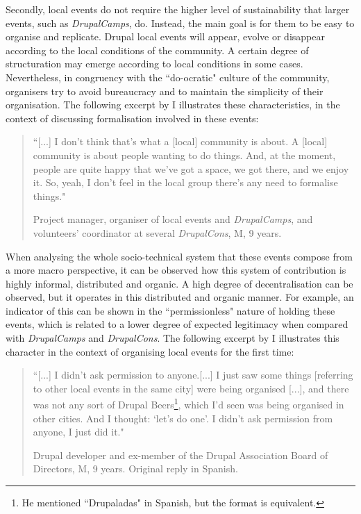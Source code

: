 Secondly, local events do not require the higher level of sustainability that larger events, such as \textit{DrupalCamps}, do. Instead, the main goal is for them to be easy to organise and replicate. Drupal local events will appear, evolve or disappear according to the local conditions of the community.  A certain degree of structuration may emerge according to local conditions in some cases. Nevertheless, in congruency with the ``do-ocratic" culture of the community, organisers try to avoid bureaucracy and to maintain the simplicity of their organisation. The following excerpt by I illustrates these characteristics, in the context of discussing formalisation involved in these events:

\begin{quotation}
``[...] I don't think that's what a [local] community is about. A [local] community is about people wanting to do things. And, at the moment, people are quite happy that we've got a space, we got there, and we enjoy it. So, yeah, I don't feel in the local group there's any need to formalise things."

\begin{flushright}\footnotesize{Project manager, organiser of local events and \textit{DrupalCamps}, and volunteers' coordinator at several \textit{DrupalCons}, M, 9 years.}\end{flushright}
\end{quotation}

When analysing the whole socio-technical system that these events compose from a more macro perspective, it can be observed how this system of contribution is highly informal, distributed and organic. A high degree of decentralisation can be observed, but it operates in this distributed and organic manner. For example, an indicator of this can be shown in the ``permissionless" nature of holding these events, which is related to a lower degree of expected legitimacy when compared with \textit{DrupalCamps} and \textit{DrupalCons}. The following excerpt by I illustrates this character in the context of organising local events for the first time:

\begin{quotation}
``[...] I didn't ask permission to anyone.[...] I just saw some things [referring to other local events in the same city] were being organised [...], and there was not any sort of Drupal Beers\footnote{He mentioned ``Drupaladas" in Spanish, but the format is equivalent.}, which I'd seen was being organised in other cities. And I thought: `let's do one'. I didn't ask permission from anyone, I just did it."

\begin{flushright}\footnotesize{Drupal developer and ex-member of the Drupal Association Board of Directors, M, 9 years. Original reply in Spanish.}\end{flushright}
\end{quotation}

